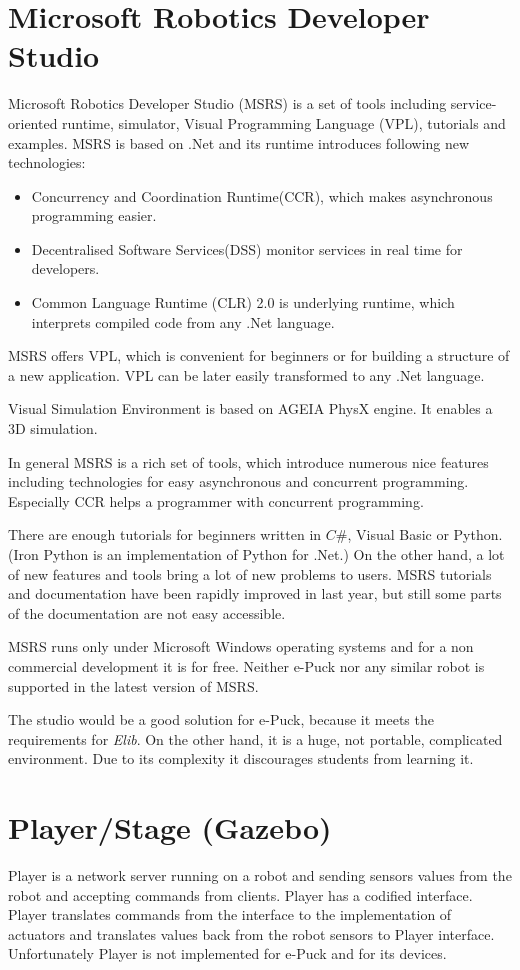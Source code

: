 \documentclass[12pt,notitlepage]{report}
\begin{document}
\section{Microsoft Robotics Developer Studio\cite{msrs}} 
	Microsoft Robotics Developer Studio (MSRS) is a set of tools including service-oriented runtime,
	simulator, Visual Programming Language (VPL),
	tutorials and examples. MSRS is based on .Net and its runtime introduces following new technologies:
	\begin{itemize}
	\item Concurrency and Coordination Runtime(CCR), which makes asynchronous programming easier.
	\item Decentralised Software Services(DSS) monitor services in real time for developers.
	\item Common Language Runtime (CLR) 2.0 is underlying runtime, 
		which interprets compiled code from any .Net language.
	\end{itemize}	
	MSRS offers VPL, which is convenient for beginners or for building a structure of a new application.
	VPL can be later easily transformed to any .Net language.
	
	Visual Simulation Environment is based on AGEIA PhysX engine. It enables a 3D simulation.
	
	In general MSRS is a rich set of tools, which introduce numerous nice features including
	technologies for easy asynchronous and concurrent programming. Especially CCR helps
	a programmer with concurrent programming. 
	
	There are enough tutorials for beginners written
	in $C\#$, Visual Basic or Python. (Iron Python is an implementation of Python for .Net.)
	On the other hand, a lot of new features and tools bring a lot of new problems to users.
	MSRS tutorials and documentation have been rapidly improved in last year, but still some parts
	of the documentation are not easy accessible.
	
	MSRS runs only under Microsoft Windows operating systems and for a non commercial development
	it is for free. Neither e-Puck nor any similar robot is supported in the latest version of MSRS.
	
	The studio would be a good solution for e-Puck, because it meets the requirements for {\it Elib}.
	On the other hand, it is a huge, not portable, complicated environment.
	Due to its complexity it discourages students from learning it.
\section{Player/Stage (Gazebo) \cite{player}}
	Player is a network server running on a robot and sending sensors values from the robot and
	accepting commands from clients. Player has a codified interface. Player translates
	commands from the interface to the implementation of actuators and translates values back from the robot sensors 
	to Player interface. Unfortunately Player is not implemented for e-Puck
	and for its devices.
	
\end{document}
